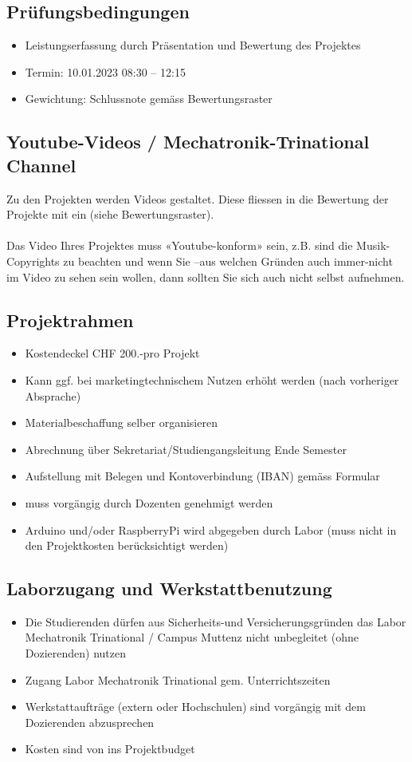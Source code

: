 \subsection*{Prüfungsbedingungen}
\begin{itemize}
    \item Leistungserfassung durch Präsentation und Bewertung des Projektes
    \item Termin: 10.01.2023	08:30 – 12:15
    \item Gewichtung: Schlussnote gemäss Bewertungsraster
\end{itemize}

\subsection*{Youtube-Videos / Mechatronik-Trinational Channel}
Zu den Projekten werden Videos gestaltet. Diese fliessen in die Bewertung der Projekte mit ein (siehe Bewertungsraster).\\
\\
Das Video Ihres Projektes muss «Youtube-konform» sein, z.B. sind die Musik-Copyrights zu beachten und wenn Sie –aus welchen Gründen auch immer-nicht im Video zu sehen sein wollen, dann sollten Sie sich auch nicht selbst aufnehmen.

\subsection*{Projektrahmen}
\begin{itemize}
    \item Kostendeckel CHF 200.-pro Projekt
    \item Kann ggf. bei marketingtechnischem Nutzen erhöht werden (nach vorheriger Absprache)
    \item Materialbeschaffung selber organisieren
    \item Abrechnung über Sekretariat/Studiengangsleitung Ende Semester
    \item Aufstellung mit Belegen und Kontoverbindung (IBAN) gemäss Formular
    \item muss vorgängig durch Dozenten genehmigt werden
    \item Arduino und/oder RaspberryPi wird abgegeben durch Labor (muss nicht in den Projektkosten berücksichtigt werden)
\end{itemize}

\subsection*{Laborzugang und Werkstattbenutzung}
\begin{itemize}
    \item Die Studierenden dürfen aus Sicherheits-und Versicherungsgründen das Labor Mechatronik Trinational / Campus Muttenz nicht unbegleitet (ohne Dozierenden) nutzen
    \item Zugang Labor Mechatronik Trinational gem. Unterrichtszeiten
    \item Werkstattaufträge (extern oder Hochschulen) sind vorgängig mit dem Dozierenden abzusprechen
    \item Kosten sind von ins Projektbudget 
\end{itemize}